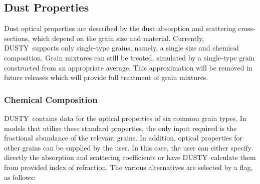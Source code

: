 \documentclass[12pt]{article} \usepackage{epsf}
\def\D  {{\sf DUSTY}}
\begin{document}
\subsection               {Dust Properties}

Dust optical properties are described by the dust absorption and scattering
cross-sections, which depend on the grain size and  material. Currently, \D\
supports only single-type grains, namely, a single size and chemical
composition.  Grain mixtures can still be treated, simulated by a single-type
grain constructed from an appropriate average.  This approximation will be
removed in future releases which will provide full treatment of grain mixtures.

\subsubsection          {Chemical Composition}
\label{chemistry}

\D\ contains data for the optical properties of six common grain types.  In
models that utilize these standard properties, the only input required is the
fractional abundance of the relevant grains.  In addition, optical properties
for other grains can be supplied by the user.  In this case, the user can either
specify directly the absorption and scattering coefficients or have \D\
calculate them from provided index of refraction. The various alternatives are
selected by a flag, as follows:
\end{document}
